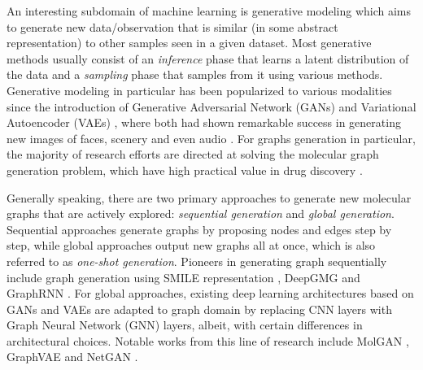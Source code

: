 An interesting subdomain of machine learning is generative modeling which aims
to generate new data/observation that is similar (in some abstract
representation) to other samples seen in a given dataset. Most generative
methods usually consist of an \textit{inference} phase that learns a latent
distribution of the data and a \textit{sampling} phase that samples from it
using various methods. Generative modeling in particular has been popularized to
various modalities since the introduction of Generative Adversarial Network
(GANs) \citep{goodfellowGenerativeAdversarialNetworks2014} and Variational
Autoencoder (VAEs) \citep{kingmaAutoEncodingVariationalBayes2014}, where both had
shown remarkable success in generating new images of faces, scenery and even
audio \citep{hersheyCNNArchitecturesLargescale2017}. For graphs generation in
particular, the majority of research efforts are directed at solving the
molecular graph generation problem, which have high practical value in drug
discovery \citep{wuComprehensiveSurveyGraph2021}.

Generally speaking, there are
two primary approaches to generate new molecular graphs that are actively
explored: \textit{sequential generation} and \textit{global generation}.
Sequential approaches generate graphs by proposing nodes and edges step by step,
while global approaches output new graphs all at once, which is also referred to as
\textit{one-shot generation}. Pioneers in generating graph sequentially include
graph generation using SMILE representation
\citep{kusnerGrammarVariationalAutoencoder2017,
gomez-bombarelliAutomaticChemicalDesign2018}, DeepGMG
\citep{liLearningDeepGenerative2018} and GraphRNN
\citep{youGraphRNNGeneratingRealistic2018}. For global approaches, existing deep
learning architectures based on GANs and VAEs are adapted to graph domain by
replacing CNN layers with Graph Neural Network (GNN) layers, albeit, with certain differences in
architectural choices. Notable works from this line of research include MolGAN
\citep{decaoMolGANImplicitGenerative2018}, GraphVAE
\citep{simonovskyGraphVAEGenerationSmall2018} and NetGAN
\citep{bojchevskiNetGANGeneratingGraphs2018}.

